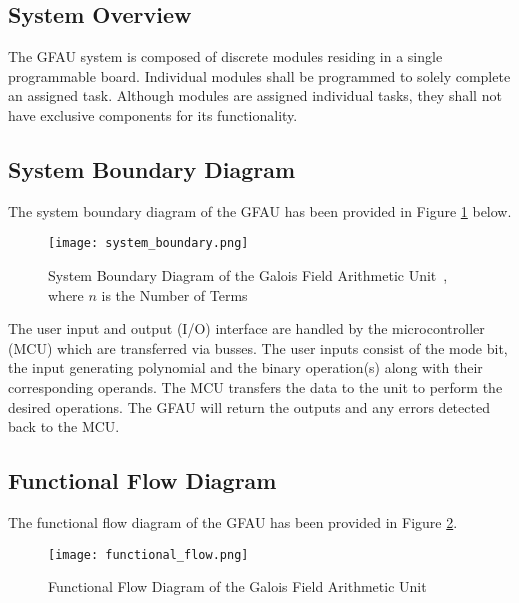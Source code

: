 \documentclass[paper=usletter, fontsize=12pt]{article}
\newcommand{\team}{Galois Field Arithmetic Unit}
\begin{document}
        \subsection{System Overview}
        The GFAU system is composed of discrete modules residing in a single programmable board. Individual modules shall be programmed to solely complete an assigned task. Although modules are assigned individual tasks, they shall not have exclusive components for its functionality.

        \subsection{System Boundary Diagram}
        The system boundary diagram of the GFAU has been provided in Figure \ref{fig:system_boundary} below.

        \begin{figure}[ht]
            \begin{center}
                \texttt{[image: system\_boundary.png]}
                \caption{System Boundary Diagram of the \team~, where $n$ is the Number of Terms} \label{fig:system_boundary}
            \end{center}
        \end{figure}

        The user input and output (I/O) interface are handled by the microcontroller (MCU) which are transferred via busses. The user inputs consist of the mode bit, the input generating polynomial and the binary operation(s) along with their corresponding operands. The MCU transfers the data to the unit to perform the desired operations. The GFAU will return the outputs and any errors detected back to the MCU.
        \newpage

        \subsection{Functional Flow Diagram}
        The functional flow diagram of the GFAU has been provided in Figure \ref{fig:functional_flow}.

        \begin{figure}[ht]
            \begin{center}
                \texttt{[image: functional\_flow.png]}
                \caption{Functional Flow Diagram of the \team~} \label{fig:functional_flow}
            \end{center}
        \end{figure}
\end{document}
